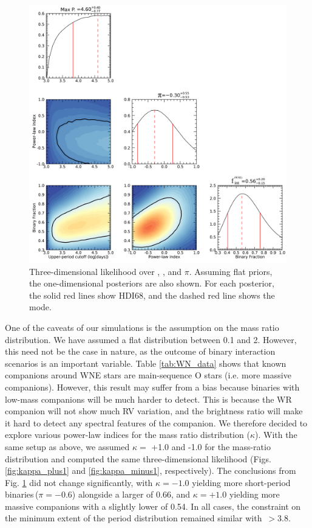 \begin{figure}[ht]
    \centering
    \includegraphics[width=\textwidth]{chapters/WNE/image/WN_AUG30_FPmaxPL_Qmax2_HighRes2_Posterior.png}
    \caption{Three-dimensional likelihood over \logPmax{}, \fintWNE{} , and $\pi$. Assuming flat priors, the one-dimensional posteriors are also shown. For each posterior, the solid red lines show HDI68, and the dashed red line shows the mode.}
    \label{fig:flat_pdist_binfrac}
\end{figure}

One of the caveats of our simulations is the assumption on the mass ratio distribution. We have assumed a flat distribution between 0.1 and 2. However, this need not be the case in nature, as the outcome of binary interaction scenarios is an important variable. Table \ref{tab:WN_data} shows that known companions around WNE stars are main-sequence O stars (i.e. more massive companions). However, this result may suffer from a bias because binaries with low-mass companions will be much harder to detect. This is because the WR companion will not show much RV variation, and the brightness ratio will make it hard to detect any spectral features of the companion. We therefore decided to explore various power-law indices for the mass ratio distribution ($\kappa$). With the same setup as above, we assumed $\kappa =$ +1.0 and -1.0 for the mass-ratio distribution and computed the same three-dimensional likelihood (Figs. \ref{fig:kappa_plus1} and \ref{fig:kappa_minus1}, respectively). The conclusions from Fig. \ref{fig:flat_pdist_binfrac} did not change significantly, with $\kappa = -1.0$ yielding more short-period binaries\,($\pi = -0.6$) alongside a larger \fintWNE{} of 0.66, and $\kappa = +1.0$ yielding more massive companions with a slightly lower \fintWNE{} of 0.54. In all cases, the constraint on the minimum extent of the period distribution remained similar with \logPmax{}\,$> 3.8$. 

